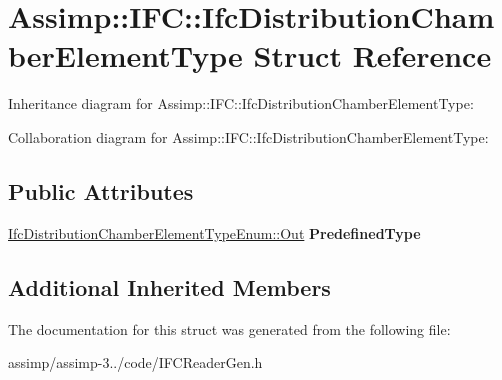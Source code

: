 \hypertarget{struct_assimp_1_1_i_f_c_1_1_ifc_distribution_chamber_element_type}{\section{Assimp\+:\+:I\+F\+C\+:\+:Ifc\+Distribution\+Chamber\+Element\+Type Struct Reference}
\label{struct_assimp_1_1_i_f_c_1_1_ifc_distribution_chamber_element_type}
}


Inheritance diagram for Assimp\+:\+:I\+F\+C\+:\+:Ifc\+Distribution\+Chamber\+Element\+Type\+:


Collaboration diagram for Assimp\+:\+:I\+F\+C\+:\+:Ifc\+Distribution\+Chamber\+Element\+Type\+:
\subsection*{Public Attributes}
\begin{DoxyCompactItemize}
\item 
\hypertarget{struct_assimp_1_1_i_f_c_1_1_ifc_distribution_chamber_element_type_a80ad49386383c579587ba830292dffb7}{\hyperlink{classboost_1_1shared__ptr}{Ifc\+Distribution\+Chamber\+Element\+Type\+Enum\+::\+Out} {\bfseries Predefined\+Type}}\label{struct_assimp_1_1_i_f_c_1_1_ifc_distribution_chamber_element_type_a80ad49386383c579587ba830292dffb7}

\end{DoxyCompactItemize}
\subsection*{Additional Inherited Members}


The documentation for this struct was generated from the following file\+:\begin{DoxyCompactItemize}
\item 
assimp/assimp-\/3../code/I\+F\+C\+Reader\+Gen.\+h\end{DoxyCompactItemize}
